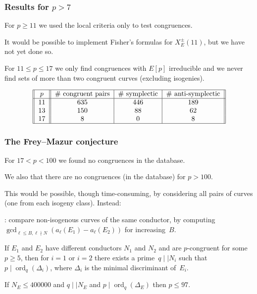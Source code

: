 \documentclass[compress]{beamer}
\DeclareMathOperator{\ord}{ord}
\newcommand{\high}[1]{\emph{\color{blue}{#1}}}
\begin{document}
\begin{frame}\frametitle{Results for $p>7$}
For $p\ge11$ we used the local criteria only to test congruences.

It would be possible to implement Fisher's formulas for
$X_E^{\pm}(11)$, but we have not yet done so.

For $11\le p\le 17$ we only find congruences with $E[p]$ irreducible
and we never find sets of more than two congruent curves (excluding
isogenies).


  \[
  \begin{tabular}{||c||c|c|c||}
    \hline
    $p$ & \# congruent pairs & \# symplectic & \# anti-symplectic\\
    \hline
    11 & 635 & 446 & 189 \\
    13 & 150 & 88 & 62 \\
    17 & 8 & 0 & 8 \\
    \hline
  \end{tabular}
  \]
\end{frame}

\begin{frame}\frametitle{The Frey--Mazur conjecture}
  For $17 < p < 100$ we found no congruences in the database.

  We also \high{proved} that there are no congruences (in the
  database) for $p>100$.

  This would be possible, though time-consuming, by considering all
  pairs of curves (one from each isogeny class). Instead:

  \medskip\pause

  \high{First}: compare non-isogenous curves of the same conductor, by
  computing $\gcd_{\ell\le B, \ell\nmid
    N}(a_{\ell}(E_1)-a_{\ell}(E_2))$ for increasing~$B$.

  \medskip\pause

  \begin{lemma}
    If $E_1$ and $E_2$ have different conductors $N_1$ and $N_2$
  and are $p$-congruent for some $p\ge5$, then for $i=1$ or $i=2$ there exists a
  prime~$q\mid\mid N_i$ such that $p\mid\ord_q(\Delta_i)$, where
  $\Delta_i$ is the minimal discriminant of~$E_i$.
  \end{lemma}
  \begin{lemma}
  If $N_E\le 400000$ and $q\mid\mid N_E$ and $p\mid\ord_q(\Delta_E)$
  then $p\le97$.
  \end{lemma}
\end{frame}
\end{document}
